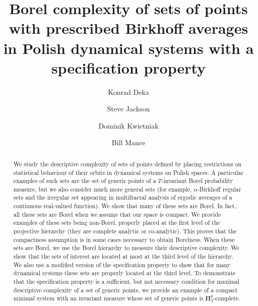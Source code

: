 \documentclass{amsart}
\author[K. Deka]{Konrad Deka}%
\author[S. Jackson]{Steve Jackson}
\author[D. Kwietniak]{Dominik Kwietniak}%
\author[B. Mance]{Bill Mance}
\title[Borel complexity of sets of orbits]%
{Borel complexity of sets of points with prescribed Birkhoff averages in Polish dynamical systems with a specification property}
\theoremstyle{definition}
\newcommand{\bp}{\boldsymbol{\Pi}}
\begin{document}
\begin{abstract}We study the descriptive complexity of sets of points
defined by placing restrictions on statistical behaviour of their orbits in dynamical systems on Polish spaces. A particular examples of such sets are the set of generic points of a $T$-invariant Borel probability measure,  but we also consider much more general sets (for example, $\alpha$-Birkhoff regular sets and the irregular set appearing in multifractal analysis of ergodic averages of a continuous real-valued function). We show that many of these sets are Borel. In fact, all these sets are Borel when we assume that our space is  compact. We provide examples of these sets being non-Borel, properly placed at the first level of the projective hierarchy (they are complete analytic or co-analytic). This proves that the compactness assumption is in some cases necessary to obtain Borelness. When these sets are Borel, we use the Borel hierarchy to measure their descriptive complexity. We show that the sets of interest are located at most at the third level of the hierarchy. We also use a modified version of the specification property to show that for many dynamical systems these sets are properly located at the third level. To demonstrate that the specification property is a sufficient, but not necessary condition for maximal descriptive complexity of a set of generic points, we provide an example of a compact minimal system with an invariant measure whose set of generic points is $\bp^0_3$-complete.
\end{abstract}

\maketitle
\end{document}
